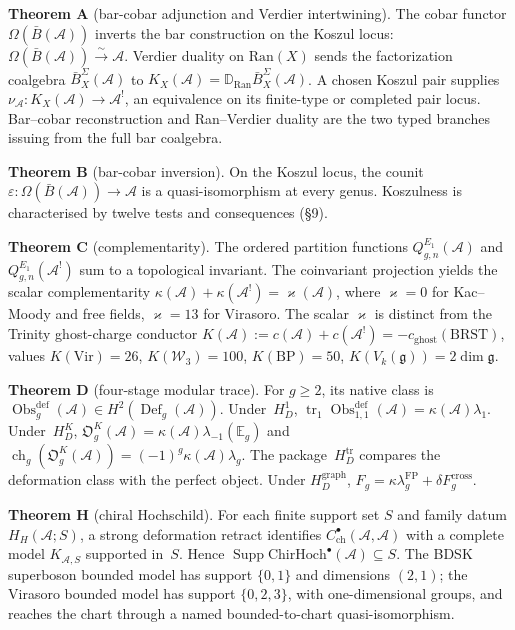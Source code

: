 \documentclass[11pt,reqno]{amsart}
\theoremstyle{definition}
\theoremstyle{remark}
\providecommand{\cA}{\mathcal{A}}
\providecommand{\cW}{\mathcal{W}}
\providecommand{\barB}{\bar{B}}
\providecommand{\Ran}{\mathrm{Ran}}
\providecommand{\fg}{\mathfrak{g}}
\providecommand{\Vir}{\mathrm{Vir}}
\providecommand{\ChirHoch}{\mathrm{ChirHoch}}
\providecommand{\BRST}{\ensuremath{\mathrm{BRST}}}
\numberwithin{equation}{section}
\begin{document}
\medskip
\noindent\textbf{Theorem A} (bar-cobar adjunction and Verdier
intertwining). The cobar functor $\Omega(\barB(\cA))$ inverts
the bar construction on the Koszul locus:
$\Omega(\barB(\cA))\xrightarrow{\sim}\cA$. Verdier duality on
$\mathrm{Ran}(X)$ sends the factorization coalgebra
$\barB_X^\Sigma(\cA)$ to
$K_X(\cA)=\mathbb D_{\Ran}\barB_X^\Sigma(\cA)$.  A chosen Koszul
pair supplies $\nu_\cA\colon K_X(\cA)\to\cA^!$, an equivalence on
its finite-type or completed pair locus.  Bar--cobar reconstruction
and Ran--Verdier duality are the two typed branches issuing from the
full bar coalgebra.

\medskip
\noindent\textbf{Theorem B} (bar-cobar inversion). On the Koszul
locus, the counit $\varepsilon\colon\Omega(\barB(\cA))\to\cA$ is a
quasi-isomorphism at every genus. Koszulness is characterised by
twelve tests and consequences (\S9).

\medskip
\noindent\textbf{Theorem C} (complementarity). The ordered
partition functions $Q^{E_1}_{g,n}(\cA)$ and $Q^{E_1}_{g,n}(\cA^!)$
sum to a topological invariant. The coinvariant projection
yields the scalar complementarity $\kappa(\cA)+\kappa(\cA^!)=\varkappa(\cA)$,
where $\varkappa=0$ for Kac--Moody and free fields, $\varkappa=13$ for Virasoro.
The scalar $\varkappa$ is distinct from the Trinity ghost-charge conductor
$K(\cA):=c(\cA)+c(\cA^!)=-c_{\mathrm{ghost}}(\BRST)$, values
$K(\Vir)=26$, $K(\cW_3)=100$, $K(\mathrm{BP})=50$, $K(V_k(\fg))=2\dim\fg$.

\medskip
\noindent\textbf{Theorem D} (four-stage modular trace).  For
$g\geq2$, its native class is
$\operatorname{Obs}^{\mathrm{def}}_g(\cA)\in
H^2(\operatorname{Def}_g(\cA))$.  Under~$H_D^1$,
$\operatorname{tr}_1\operatorname{Obs}^{\mathrm{def}}_{1,1}(\cA)
=\kappa(\cA)\lambda_1$.  Under~$H_D^K$,
$\mathfrak O_g^K(\cA)=\kappa(\cA)\lambda_{-1}(\mathbb E_g)$ and
$\operatorname{ch}_g(\mathfrak O_g^K(\cA))=
(-1)^g\kappa(\cA)\lambda_g$.  The package~$H_D^{\mathrm{tr}}$
compares the deformation class with the perfect object.  Under
$H_D^{\mathrm{graph}}$,
$F_g=\kappa\lambda_g^{\mathrm{FP}}+\delta F_g^{\mathrm{cross}}$.

\medskip
\noindent\textbf{Theorem H} (chiral Hochschild).
For each finite support set \(S\) and family datum \(H_H(\cA;S)\), a
strong deformation retract identifies
\(C^\bullet_{\mathrm{ch}}(\cA,\cA)\) with a complete model
\(K_{\cA,S}\) supported in~\(S\).  Hence
\(\operatorname{Supp}\ChirHoch^\bullet(\cA)\subseteq S\).
The BDSK superboson bounded model has support \(\{0,1\}\) and
dimensions \((2,1)\); the Virasoro bounded model has support
\(\{0,2,3\}\), with one-dimensional groups, and reaches the chart
through a named bounded-to-chart quasi-isomorphism.
\end{document}
